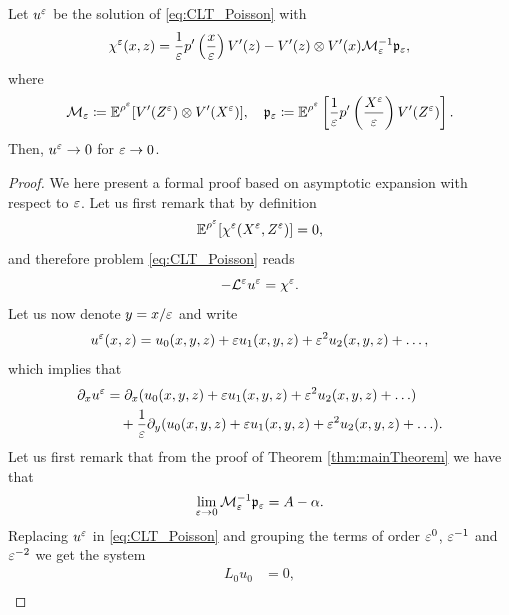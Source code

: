 \documentclass[10pt]{article}
\begin{document}
\begin{lemma} \label{lem:CLT_hom}
	Let $u^\varepsilon$ be the solution of \eqref{eq:CLT_Poisson} with 
	\begin{equation}
		\chi^\varepsilon(x, z) = \frac 1 {\varepsilon} p' \left ( \frac x {\varepsilon} \right ) V'(z) - V'(z) \otimes V'(x) \mathcal M_\varepsilon^{-1} \mathfrak p_\varepsilon,
	\end{equation}
	where
	\begin{equation}
		\mathcal M_\varepsilon \coloneqq \operatorname{\mathbb{E}}^{\rho^\varepsilon} [ V'(Z^\varepsilon) \otimes V'(X^\varepsilon) ], \quad \mathfrak p_\varepsilon \coloneqq \operatorname{\mathbb{E}}^{\rho^\varepsilon} \left [ \frac{1}{\varepsilon} p' \left ( \frac{X^\varepsilon}{\varepsilon} \right ) V'(Z^\varepsilon) \right ].
	\end{equation}
	Then, $u^\varepsilon \to 0$  for $\varepsilon \to 0$.
\end{lemma}
\begin{proof} We here present a formal proof based on asymptotic expansion with respect to $\varepsilon$. Let us first remark that by definition
	\begin{equation}
		\operatorname{\mathbb{E}}^{\rho^\varepsilon}[\chi^\varepsilon(X^\varepsilon, Z^\varepsilon)] = 0,
	\end{equation}
	and therefore problem \eqref{eq:CLT_Poisson} reads
	\begin{equation}
		-\mathcal L^\varepsilon u^\varepsilon = \chi^\varepsilon.
	\end{equation}
	Let us now denote $y = x/\varepsilon$ and write
	\begin{equation}
		u^\varepsilon(x, z) = u_0(x, y, z) + \varepsilon u_1(x, y, z) + \varepsilon^2 u_2(x, y, z) + \ldots,
	\end{equation}
	which implies that
	\begin{equation}
	\begin{aligned}
		\partial_x u^\varepsilon &= \partial_x(u_0(x, y, z) + \varepsilon u_1(x, y, z) + \varepsilon^2 u_2(x, y, z) + \ldots) \\
		&\quad+ \frac1{\varepsilon}\partial_y(u_0(x, y, z) + \varepsilon u_1(x, y, z) + \varepsilon^2 u_2(x, y, z) + \ldots).
	\end{aligned}
	\end{equation}
	Let us first remark that from the proof of Theorem \ref{thm:mainTheorem} we have that
	\begin{equation}
		\lim_{\varepsilon \to 0} \mathcal M_\varepsilon^{-1}\mathfrak p_\varepsilon = A - \alpha.
	\end{equation} 	
	Replacing $u^\varepsilon$ in \eqref{eq:CLT_Poisson} and grouping the terms of order $\varepsilon^0$, $\varepsilon^{-1}$ and $\varepsilon^{-2}$ we get the system
	\begin{align}
		L_0 u_0 &= 0, \label{eq:CLT_AsExp1}\\

\end{align}
\end{proof}
\end{document}
